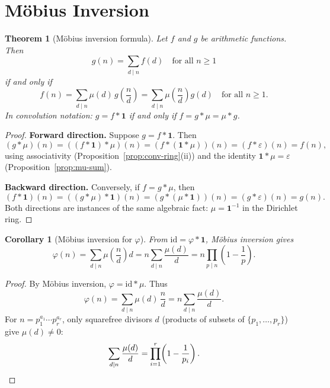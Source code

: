 \documentclass[12pt,a4paper,openany]{book}
\theoremstyle{definition}
\theoremstyle{plain}
\newtheorem{theorem}[definition]{Theorem}
\newtheorem{corollary}[definition]{Corollary}
\theoremstyle{remark}
\begin{document}
\section{M\"obius Inversion}\label{sec:mobius-inversion}

\begin{theorem}[M\"obius inversion formula]\label{thm:mobius-inversion}
Let $f$ and $g$ be arithmetic functions.  Then
\[
  g(n) = \sum_{d \mid n} f(d) \quad \text{for all } n \ge 1
\]
if and only if
\[
  f(n) = \sum_{d \mid n} \mu(d)\,g\!\left(\frac{n}{d}\right)
       = \sum_{d \mid n} \mu\!\left(\frac{n}{d}\right) g(d)
  \quad \text{for all } n \ge 1.
\]
In convolution notation: $g = f \ast \mathbf{1}$ if and only if
$f = g \ast \mu = \mu \ast g$.
\end{theorem}

\begin{proof}
\textbf{Forward direction.}
Suppose $g = f \ast \mathbf{1}$.  Then
\[
  (g \ast \mu)(n) = ((f \ast \mathbf{1})\ast \mu)(n)
                  = (f \ast (\mathbf{1} \ast \mu))(n)
                  = (f \ast \varepsilon)(n) = f(n),
\]
using associativity (Proposition~\ref{prop:conv-ring}(ii)) and the
identity $\mathbf{1}\ast\mu = \varepsilon$ (Proposition~\ref{prop:mu-sum}).

\textbf{Backward direction.}
Conversely, if $f = g \ast \mu$, then
\[
  (f \ast \mathbf{1})(n) = ((g \ast \mu)\ast \mathbf{1})(n)
                         = (g \ast (\mu \ast \mathbf{1}))(n)
                         = (g \ast \varepsilon)(n) = g(n).
\]
Both directions are instances of the same algebraic fact:
$\mu = \mathbf{1}^{-1}$ in the Dirichlet ring.
\end{proof}

\begin{corollary}[M\"obius inversion for $\varphi$]\label{cor:phi-mobius}
From $\mathrm{id} = \varphi \ast \mathbf{1}$, M\"obius inversion gives
\[
  \varphi(n) = \sum_{d \mid n} \mu\!\left(\frac{n}{d}\right) d
             = n \sum_{d \mid n} \frac{\mu(d)}{d}
             = n \prod_{p \mid n}\!\left(1 - \frac{1}{p}\right).
\]
\end{corollary}

\begin{proof}
By M\"obius inversion, $\varphi = \mathrm{id} \ast \mu$.  Thus
\[
  \varphi(n) = \sum_{d\mid n} \mu(d)\,\frac{n}{d}
             = n \sum_{d\mid n}\frac{\mu(d)}{d}.
\]
For $n = p_1^{a_1}\cdots p_r^{a_r}$, only squarefree divisors $d$
(products of subsets of $\{p_1,\ldots,p_r\}$) give $\mu(d)\neq 0$:
\[
  \sum_{d\mid n}\frac{\mu(d)}{d}
  = \prod_{i=1}^{r}\!\left(1 - \frac{1}{p_i}\right). \qedhere
\]
\end{proof}
\end{document}
